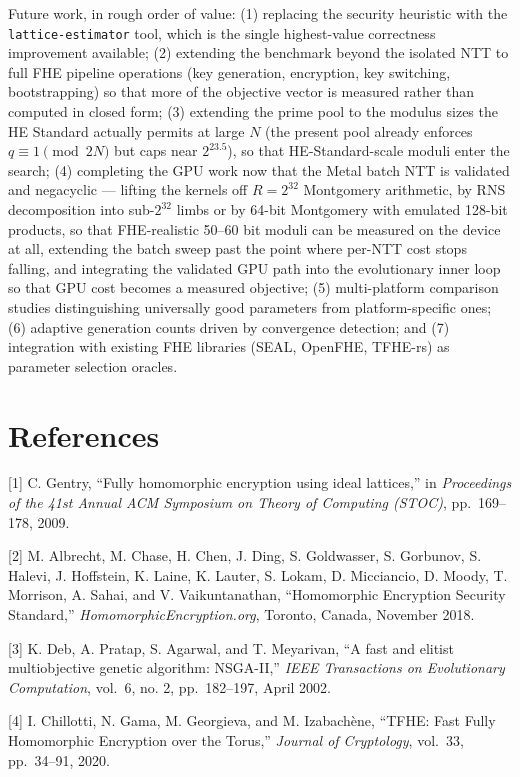 Future work, in rough order of value: (1) replacing the security heuristic with the \texttt{lattice-estimator} tool, which is the single highest-value correctness improvement available; (2) extending the benchmark beyond the isolated NTT to full FHE pipeline operations (key generation, encryption, key switching, bootstrapping) so that more of the objective vector is measured rather than computed in closed form; (3) extending the prime pool to the modulus sizes the HE Standard actually permits at large \(N\) (the present pool already enforces \(q \equiv 1 \pmod{2N}\) but caps near \(2^{23.5}\)), so that HE-Standard-scale moduli enter the search; (4) completing the GPU work now that the Metal batch NTT is validated and negacyclic --- lifting the kernels off \(R = 2^{32}\) Montgomery arithmetic, by RNS decomposition into sub-\(2^{32}\) limbs or by 64-bit Montgomery with emulated 128-bit products, so that FHE-realistic 50--60 bit moduli can be measured on the device at all, extending the batch sweep past the point where per-NTT cost stops falling, and integrating the validated GPU path into the evolutionary inner loop so that GPU cost becomes a measured objective; (5) multi-platform comparison studies distinguishing universally good parameters from platform-specific ones; (6) adaptive generation counts driven by convergence detection; and (7) integration with existing FHE libraries (SEAL, OpenFHE, TFHE-rs) as parameter selection oracles.

\section*{References}\label{references}

[1] C. Gentry, ``Fully homomorphic encryption using ideal lattices,'' in \emph{Proceedings of the 41st Annual ACM Symposium on Theory of Computing (STOC)}, pp.~169--178, 2009.

[2] M. Albrecht, M. Chase, H. Chen, J. Ding, S. Goldwasser, S. Gorbunov, S. Halevi, J. Hoffstein, K. Laine, K. Lauter, S. Lokam, D. Micciancio, D. Moody, T. Morrison, A. Sahai, and V. Vaikuntanathan, ``Homomorphic Encryption Security Standard,'' \emph{HomomorphicEncryption.org}, Toronto, Canada, November 2018.

[3] K. Deb, A. Pratap, S. Agarwal, and T. Meyarivan, ``A fast and elitist multiobjective genetic algorithm: NSGA-II,'' \emph{IEEE Transactions on Evolutionary Computation}, vol.~6, no. 2, pp.~182--197, April 2002.

[4] I. Chillotti, N. Gama, M. Georgieva, and M. Izabachène, ``TFHE: Fast Fully Homomorphic Encryption over the Torus,'' \emph{Journal of Cryptology}, vol.~33, pp.~34--91, 2020.

